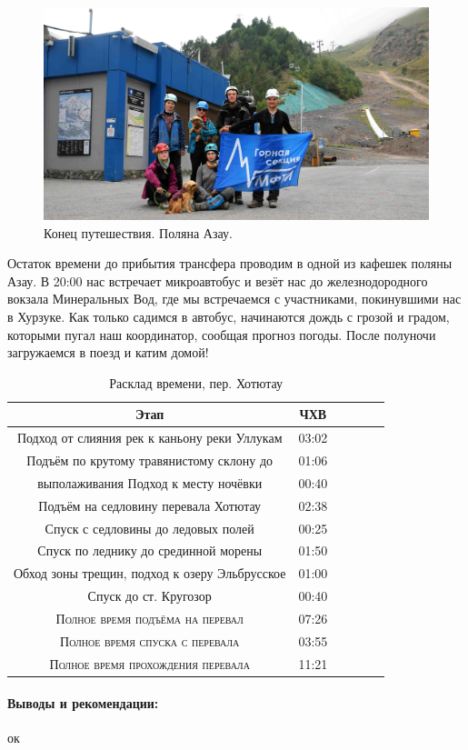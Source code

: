 \begin{figure}[h!]
	\centering
	\includegraphics[width=0.7\linewidth]{../pics/group_finish.jpg}
	\caption{Конец путешествия. Поляна Азау.}
	\label{fig:group_finish}
\end{figure}

Остаток времени до прибытия трансфера проводим в одной из кафешек поляны Азау.
В 20:00 нас встречает микроавтобус и везёт нас до железнодородного вокзала Минеральных Вод, где мы встречаемся с участниками, покинувшими нас в Хурзуке. Как только садимся в автобус, начинаются дождь с грозой и градом, которыми пугал наш координатор, сообщая прогноз погоды. После полуночи загружаемся в поезд и катим домой!


\begin{table}[h!]
	\centering
	\begin{tabular}{|c|c|c|c|c|c|} 
		\hline 
		Этап & ЧХВ \\ 	
		\hline 
		Подход от слияния рек к каньону реки Уллукам		& 03:02\\
		Подъём по крутому травянистому склону до& 01:06 \\ выполаживания 
		Подход к месту ночёвки & 00:40 \\
		Подъём на седловину перевала Хотютау & 02:38\\
		Спуск с седловины до ледовых полей& 00:25\\
		Спуск по леднику до срединной морены & 01:50\\
		Обход зоны трещин, подход к озеру Эльбрусское& 01:00\\
		Спуск до ст. Кругозор & 00:40 \\
			
		\hline
		\textsc{Полное время подъёма на перевал  }& 07:26\\
		\textsc{Полное время спуска с перевала }& 03:55 \\
		\textsc{Полное время прохождения перевала }& 11:21 \\
		\hline
	\end{tabular}
	\caption{Расклад времени, пер. Хотютау}
\end{table}

\paragraph{Выводы и рекомендации:} ок


\clearpage
